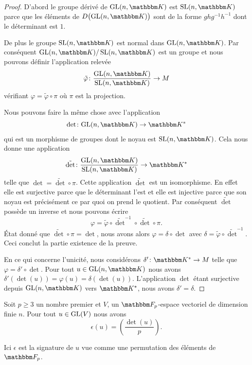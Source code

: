 \begin{proof}
    D'abord le groupe dérivé de \( \GL(n,\eK)\) est \( \SL(n,\eK)\) parce que les éléments de \( D\big( \GL(n,\eK) \big)\) sont de la forme \( ghg^{-1}h^{-1}\) dont le déterminant est \( 1\).

    De plus le groupe \( \SL(n,\eK)\) est normal dans \( \GL(n,\eK)\). Par conséquent \( \GL(n,\eK)/\SL(n,\eK)\) est un groupe et nous pouvons définir l'application relevée
    \begin{equation}
        \tilde \varphi\colon \frac{ \GL(n,\eK) }{ \SL(n,\eK) }\to M
    \end{equation}
    vérifiant \( \varphi=\tilde \varphi\circ\pi\) où \( \pi\) est la projection.

    Nous pouvons faire la même chose avec l'application
    \begin{equation}
        \det\colon \GL(n,\eK)\to \eK^*
    \end{equation}
    qui est un morphisme de groupes dont le noyau est \( \SL(n,\eK)\). Cela nous donne une application
    \begin{equation}
        \tilde \det\colon \frac{ \GL(n,\eK) }{ \SL(n,\eK) }\to \eK^*
    \end{equation}
    telle que \( \det=\tilde \det\circ\pi\). Cette application \( \tilde \det\) est un isomorphisme. En effet elle est surjective parce que le déterminant l'est et elle est injective parce que son noyau est précisément ce par quoi on prend le quotient. Par conséquent \( \tilde \det \) possède un inverse et nous pouvons écrire
    \begin{equation}
        \varphi=\tilde \varphi\circ\tilde \det^{-1}\circ\tilde \det\circ\pi.
    \end{equation}
    État donné que \( \tilde \det\circ\pi=\det\), nous avons alors \( \varphi=\delta\circ\det\) avec \( \delta=\tilde \varphi\circ\tilde \det^{-1}\). Ceci conclut la partie existence de la preuve.

    En ce qui concerne l'unicité, nous considérons \( \delta'\colon \eK^*\to M\) telle que \( \varphi=\delta'\circ\det\). Pour tout \( u\in \GL(n,\eK)\) nous avons \( \delta'(\det(u))=\varphi(u)=\delta(\det(u))\). L'application \( \det\) étant surjective depuis \( \GL(n,\eK)\) vers \( \eK^*\), nous avons \( \delta'=\delta\).
\end{proof}

\begin{theorem}
    Soit \( p\geq 3\) un nombre premier et \( V\), un \( \eF_p\)-espace vectoriel de dimension finie \( n\). Pour tout \( u\in\textup{GL}(V)\) nous avons
    \begin{equation}
        \epsilon(u)=\left(\frac{\det(u)}{p}\right).
    \end{equation}
\end{theorem}
Ici \( \epsilon\) est la signature de \( u \) vue comme une permutation des éléments de \( \eF_p\).

